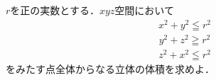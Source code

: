 \documentclass[../../main.tex]{subfiles}
\begin{document}
$r$を正の実数とする．$xyz$空間において
\begin{align*}
  x^2+y^2 \leqq r^2
\end{align*}
\begin{align*}
  y^2+z^2 \geqq r^2
\end{align*}
\begin{align*}
  z^2+x^2 \leqq r^2
\end{align*}
をみたす点全体からなる立体の体積を求めよ．
\end{document}
